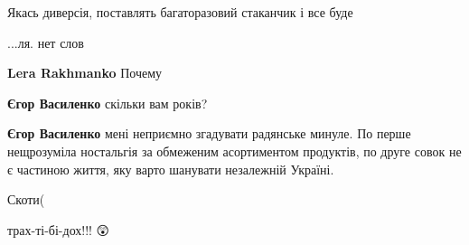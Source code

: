 \begin{itemize}
Якась диверсія, поставлять багаторазовий стаканчик і все буде👑

 
...ля. нет слов

\begin{itemize}
 
\textbf{Lera Rakhmanko} Почему

 
\textbf{Єгор Василенко} скільки вам років?

 
\textbf{Єгор Василенко} мені неприємно згадувати радянське минуле. По перше
нещрозуміла ностальгія за обмеженим асортиментом продуктів, по друге совок не є
частиною життя, яку варто шанувати незалежній Україні.

\end{itemize}

 
Скоти(

 
трах-ті-бі-дох!!! 😲


\end{itemize}

